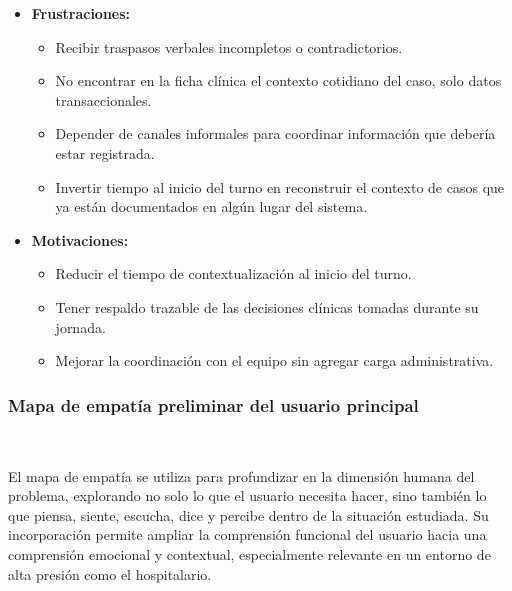 \begin{itemize}
    \item \textbf{Frustraciones:}
    \begin{itemize}
        \item Recibir traspasos verbales incompletos o contradictorios.
        \item No encontrar en la ficha clínica el contexto cotidiano del caso, solo datos transaccionales.
        \item Depender de canales informales para coordinar información que debería estar registrada.
        \item Invertir tiempo al inicio del turno en reconstruir el contexto de casos que ya están documentados en algún lugar del sistema.
    \end{itemize}

    \item \textbf{Motivaciones:}
    \begin{itemize}
        \item Reducir el tiempo de contextualización al inicio del turno.
        \item Tener respaldo trazable de las decisiones clínicas tomadas durante su jornada.
        \item Mejorar la coordinación con el equipo sin agregar carga administrativa.\\
    \end{itemize}
\end{itemize}

\subsubsection*{Mapa de empatía preliminar del usuario principal} ~

El mapa de empatía se utiliza para profundizar en la dimensión humana del problema, explorando no solo lo que el usuario necesita hacer, sino también lo que piensa, siente, escucha, dice y percibe dentro de la situación estudiada. Su incorporación permite ampliar la comprensión funcional del usuario hacia una comprensión emocional y contextual, especialmente relevante en un entorno de alta presión como el hospitalario.

